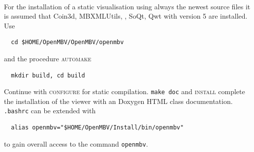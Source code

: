 \paragraph{\OpenMBV{}}
For the installation of a static visualisation using always the newest source files it is assumed that Coin3d, MBXMLUtils, \HDFSerie, SoQt, Qwt with version 5 are installed. Use
\begin{verbatim}
  cd $HOME/OpenMBV/OpenMBV/openmbv
\end{verbatim} 
and the procedure \textsc{automake}
\begin{verbatim}
  mkdir build, cd build
\end{verbatim}
Continue with \textsc{configure} for static compilation. \texttt{make doc} and \textsc{install} complete the installation of the viewer with an Doxygen HTML class documentation. \texttt{.bashrc} can be extended with
\begin{verbatim}
  alias openmbv="$HOME/OpenMBV/Install/bin/openmbv"
\end{verbatim}
to gain overall access to the command \texttt{openmbv}.
